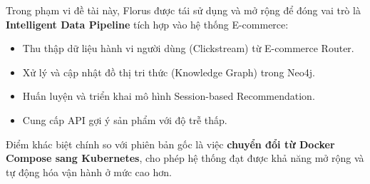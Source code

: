 Trong phạm vi đề tài này, Florus được tái sử dụng và mở rộng để đóng vai trò là \textbf{Intelligent Data Pipeline} tích hợp vào hệ thống E-commerce:

\begin{itemize}
    \item Thu thập dữ liệu hành vi người dùng (Clickstream) từ E-commerce Router.
    \item Xử lý và cập nhật đồ thị tri thức (Knowledge Graph) trong Neo4j.
    \item Huấn luyện và triển khai mô hình Session-based Recommendation.
    \item Cung cấp API gợi ý sản phẩm với độ trễ thấp.
\end{itemize}

Điểm khác biệt chính so với phiên bản gốc là việc \textbf{chuyển đổi từ Docker Compose sang Kubernetes}, cho phép hệ thống đạt được khả năng mở rộng và tự động hóa vận hành ở mức cao hơn.
